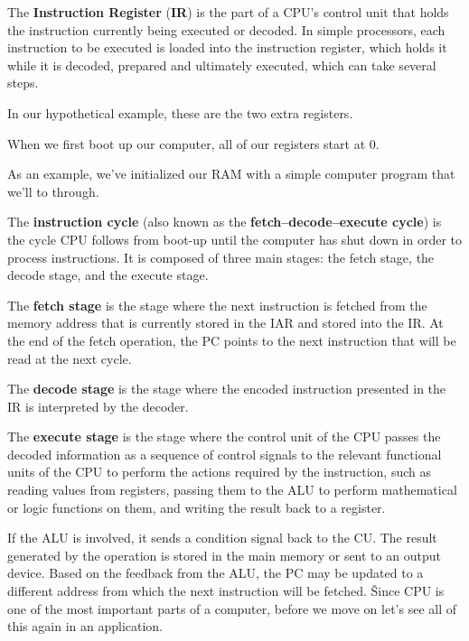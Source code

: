 The \textbf{Instruction Register} (\textbf{IR}) is the part of a CPU's control unit that holds the instruction
currently being executed or decoded. In simple processors, each instruction to be executed is loaded into the
instruction register, which holds it while it is decoded, prepared and ultimately executed, which can take several
steps.
\ed

\be
In our hypothetical example, these are the two extra registers.

\ee

When we first boot up our computer, all of our registers start at 0.

\be
As an example, we've initialized our RAM with a simple computer program that we'll to through.

\ee

The \textbf{instruction cycle} (also known as the \textbf{fetch–decode–execute cycle}) is the cycle CPU follows from
boot-up until the computer has shut down in order to process instructions. It is composed of three main stages: the
fetch stage, the decode stage, and the execute stage.
\ed

The \textbf{fetch stage} is the stage where the next instruction is fetched from the memory address that is currently
stored in the IAR and stored into the IR. At the end of the fetch operation, the PC points to the next instruction
that will be read at the next cycle.
\ed

The \textbf{decode stage} is the stage where the encoded instruction presented in the IR is interpreted by the
decoder.
\ed

The \textbf{execute stage} is the stage where the control unit of the CPU passes the decoded information as a
sequence of control signals to the relevant functional units of the CPU to perform the actions required by the
instruction, such as reading values from registers, passing them to the ALU to perform mathematical or logic
functions on them, and writing the result back to a register.
\ed

If the ALU is involved, it sends a condition signal back to the CU. The result generated by the operation is stored
in the main memory or sent to an output device. Based on the feedback from the ALU, the PC may be updated to a
different address from which the next instruction will be fetched. \v

Since CPU is one of the most important parts of a computer, before we move on let's see all of this again in an
application.

